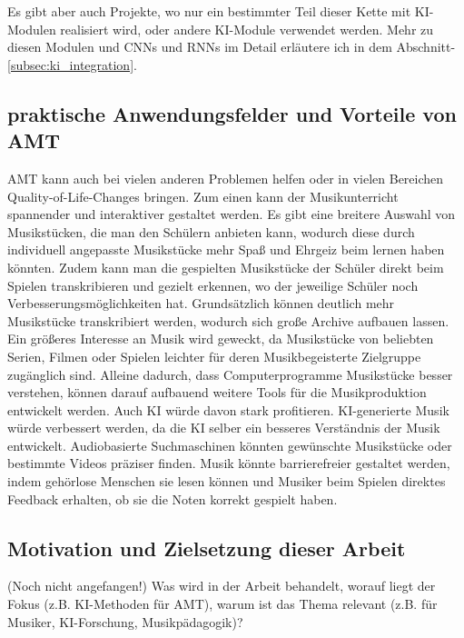 Es gibt aber auch Projekte, wo nur ein bestimmter Teil dieser Kette mit KI-Modulen realisiert wird,
oder andere KI-Module verwendet werden.
Mehr zu diesen Modulen und CNNs und RNNs im Detail erläutere ich in dem Abschnitt-\ref{subsec:ki_integration}.

\subsection{praktische Anwendungsfelder und Vorteile von AMT}
AMT kann auch bei vielen anderen Problemen helfen
oder in vielen Bereichen Quality-of-Life-Changes bringen.
Zum einen kann der Musikunterricht spannender und interaktiver gestaltet werden.
Es gibt eine breitere Auswahl von Musikstücken, die man den Schülern anbieten kann,
wodurch diese durch individuell angepasste Musikstücke mehr Spaß und Ehrgeiz beim lernen haben könnten.
Zudem kann man die gespielten Musikstücke der Schüler direkt beim Spielen transkribieren und gezielt erkennen,
wo der jeweilige Schüler noch Verbesserungsmöglichkeiten hat.
Grundsätzlich können deutlich mehr Musikstücke transkribiert werden,
wodurch sich große Archive aufbauen lassen.
Ein größeres Interesse an Musik wird geweckt, da Musikstücke von beliebten Serien, Filmen oder Spielen
leichter für deren Musikbegeisterte Zielgruppe zugänglich sind.
Alleine dadurch, dass Computerprogramme Musikstücke besser verstehen,
können darauf aufbauend weitere Tools für die Musikproduktion entwickelt werden.
Auch KI würde davon stark profitieren.
KI-generierte Musik würde verbessert werden, da die KI selber ein besseres Verständnis der Musik entwickelt.
Audiobasierte Suchmaschinen könnten gewünschte Musikstücke oder bestimmte Videos präziser finden.
Musik könnte barrierefreier gestaltet werden,
indem gehörlose Menschen sie lesen können und Musiker beim Spielen direktes Feedback erhalten,
ob sie die Noten korrekt gespielt haben.


\subsection{Motivation und Zielsetzung dieser Arbeit} (Noch nicht angefangen!)
Was wird in der Arbeit behandelt, worauf liegt der Fokus (z.B. KI-Methoden für AMT), warum ist das Thema relevant (z.B. für Musiker, KI-Forschung, Musikpädagogik)?

